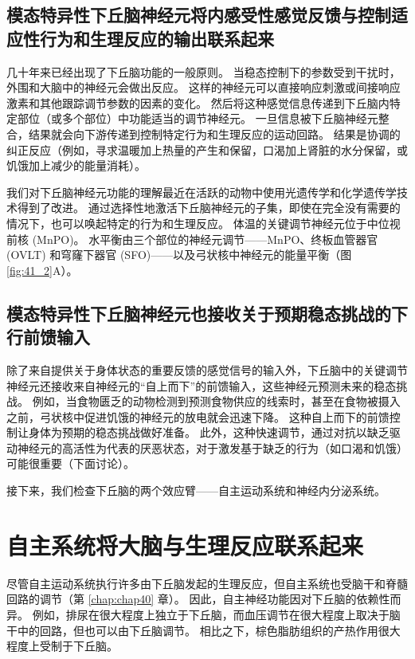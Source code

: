 \subsection{模态特异性下丘脑神经元将内感受性感觉反馈与控制适应性行为和生理反应的输出联系起来}
几十年来已经出现了下丘脑功能的一般原则。 当稳态控制下的参数受到干扰时，外围和大脑中的神经元会做出反应。 这样的神经元可以直接响应刺激或间接响应激素和其他跟踪调节参数的因素的变化。 然后将这种感觉信息传递到下丘脑内特定部位（或多个部位）中功能适当的调节神经元。 一旦信息被下丘脑神经元整合，结果就会向下游传递到控制特定行为和生理反应的运动回路。 结果是协调的纠正反应（例如，寻求温暖加上热量的产生和保留，口渴加上肾脏的水分保留，或饥饿加上减少的能量消耗）。

我们对下丘脑神经元功能的理解最近在活跃的动物中使用光遗传学和化学遗传学技术得到了改进。 通过选择性地激活下丘脑神经元的子集，即使在完全没有需要的情况下，也可以唤起特定的行为和生理反应。 体温的关键调节神经元位于中位视前核 (MnPO)。 水平衡由三个部位的神经元调节——MnPO、终板血管器官 (OVLT) 和穹窿下器官 (SFO)——以及弓状核中神经元的能量平衡（图 \ref{fig:41_2}A）。



\subsection{模态特异性下丘脑神经元也接收关于预期稳态挑战的下行前馈输入}

除了来自提供关于身体状态的重要反馈的感觉信号的输入外，下丘脑中的关键调节神经元还接收来自神经元的“自上而下”的前馈输入，这些神经元预测未来的稳态挑战。 例如，当食物匮乏的动物检测到预测食物供应的线索时，甚至在食物被摄入之前，弓状核中促进饥饿的神经元的放电就会迅速下降。 这种自上而下的前馈控制让身体为预期的稳态挑战做好准备。 此外，这种快速调节，通过对抗以缺乏驱动神经元的高活性为代表的厌恶状态，对于激发基于缺乏的行为（如口渴和饥饿）可能很重要（下面讨论）。

接下来，我们检查下丘脑的两个效应臂——自主运动系统和神经内分泌系统。

\section{自主系统将大脑与生理反应联系起来}
尽管自主运动系统执行许多由下丘脑发起的生理反应，但自主系统也受脑干和脊髓回路的调节（第 \ref{chap:chap40} 章）。 因此，自主神经功能因对下丘脑的依赖性而异。 例如，排尿在很大程度上独立于下丘脑，而血压调节在很大程度上取决于脑干中的回路，但也可以由下丘脑调节。 相比之下，棕色脂肪组织的产热作用很大程度上受制于下丘脑。

